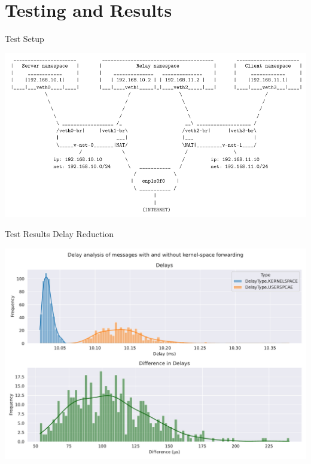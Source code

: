 \documentclass[shortpres,aspectratio=43]{beamer}
\begin{document}

\section{Testing and Results}

\begin{frame}{}
  \tableofcontents[currentsection]
\end{frame}

\begin{frame}{Test Setup}
    \begin{minipage}{\textwidth}
        \centering
        \includegraphics[scale=0.7]{figures/ns-setup.pdf}
    \end{minipage}
\end{frame}

\begin{frame}{Test Results Delay Reduction}
    \begin{minipage}{\textwidth}
        \centering
        \includegraphics[scale=0.4]{../figures/04_testing_and_results/delays_small_packets_simple_userspace.pdf}
    \end{minipage}\hfill
\end{frame}
\end{document}
